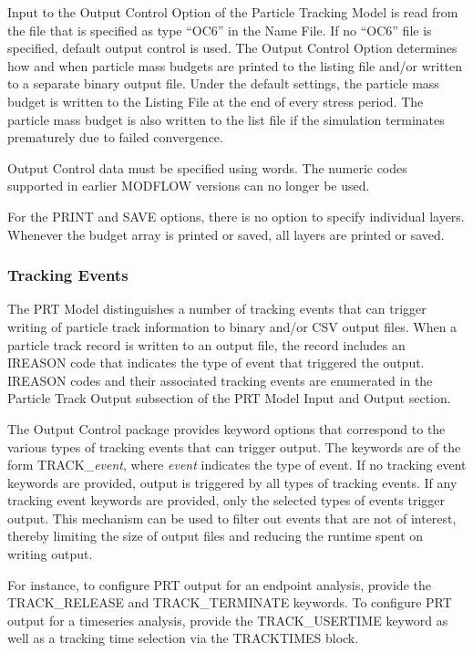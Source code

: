 Input to the Output Control Option of the Particle Tracking Model is read from the file that is specified as type ``OC6'' in the Name File. If no ``OC6'' file is specified, default output control is used. The Output Control Option determines how and when particle mass budgets are printed to the listing file and/or written to a separate binary output file.  Under the default settings, the particle mass budget is written to the Listing File at the end of every stress period.  The particle mass budget is also written to the list file if the simulation terminates prematurely due to failed convergence.

Output Control data must be specified using words.  The numeric codes supported in earlier MODFLOW versions can no longer be used.

For the PRINT and SAVE options, there is no option to specify individual layers.  Whenever the budget array is printed or saved, all layers are printed or saved.

\vspace{5mm}
\subsubsection{Tracking Events}

The PRT Model distinguishes a number of tracking events that can trigger writing of particle track information to binary and/or CSV output files. When a particle track record is written to an output file, the record includes an IREASON code that indicates the type of event that triggered the output. IREASON codes and their associated tracking events are enumerated in the Particle Track Output subsection of the PRT Model Input and Output section.
 
The Output Control package provides keyword options that correspond to the various types of tracking events that can trigger output. The keywords are of the form TRACK\_\textit{event}, where \textit{event} indicates the type of event. If no tracking event keywords are provided, output is triggered by all types of tracking events. If any tracking event keywords are provided, only the selected types of events trigger output. This mechanism can be used to filter out events that are not of interest, thereby limiting the size of output files and reducing the runtime spent on writing output.
 
For instance, to configure PRT output for an endpoint analysis, provide the TRACK\_RELEASE and TRACK\_TERMINATE keywords. To configure PRT output for a timeseries analysis, provide the TRACK\_USERTIME keyword as well as a tracking time selection via the TRACKTIMES block.

